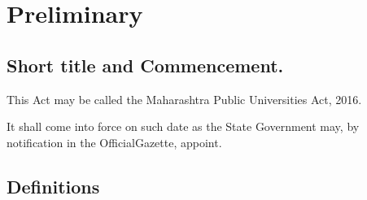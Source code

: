 \documentclass[gaz5a]{mhact}
\begin{document}
      \chapter{Preliminary}
      

      \section{Short title and Commencement.}
      

      \begin{subsectionlist}
    

This Act may be called the Maharashtra Public Universities Act, 2016.

      

It shall come into force on such date as the State Government may, by notification in the OfficialGazette, appoint.

      
       \end{subsectionlist}
    
      \section{Definitions}
      
\end{document}
